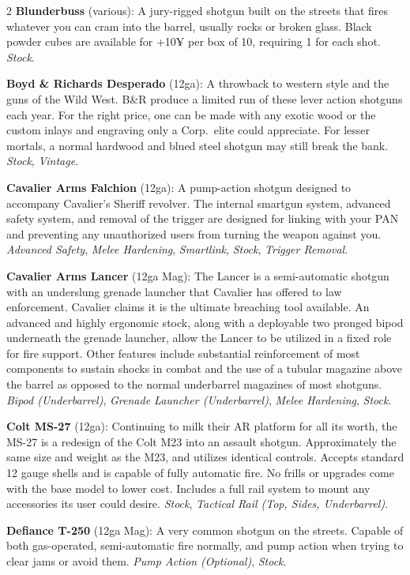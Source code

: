 \documentclass[
  oneside]{article}
\begin{document}
\begin{multicols}{2}
\textbf{Blunderbuss} (various): A jury-rigged
shotgun built on the streets that fires whatever
you can cram into the barrel, usually rocks or
broken glass. Black powder cubes are available for
+10¥ per box of 10, requiring 1 for each shot.
\emph{Stock}.

\textbf{Boyd \& Richards Desperado} (12ga): A
throwback to western style and the guns of the
Wild West. B\&R produce a limited run of these
lever action shotguns each year. For the right
price, one can be made with any exotic wood or the
custom inlays and engraving only a Corp.~elite
could appreciate. For lesser mortals, a normal
hardwood and blued steel shotgun may still break
the bank. \emph{Stock}, \emph{Vintage}.

\textbf{Cavalier Arms Falchion} (12ga): A
pump-action shotgun designed to accompany
Cavalier's Sheriff revolver. The internal smartgun
system, advanced safety system, and removal of the
trigger are designed for linking with your PAN and
preventing any unauthorized users from turning the
weapon against you. \emph{Advanced Safety},
\emph{Melee Hardening}, \emph{Smartlink},
\emph{Stock}, \emph{Trigger Removal}.

\textbf{Cavalier Arms Lancer} (12ga Mag): The
Lancer is a semi-automatic shotgun with an
underslung grenade launcher that Cavalier has
offered to law enforcement. Cavalier claims it is
the ultimate breaching tool available. An advanced
and highly ergonomic stock, along with a
deployable two pronged bipod underneath the
grenade launcher, allow the Lancer to be utilized
in a fixed role for fire support. Other features
include substantial reinforcement of most
components to sustain shocks in combat and the use
of a tubular magazine above the barrel as opposed
to the normal underbarrel magazines of most
shotguns. \emph{Bipod (Underbarrel)},
\emph{Grenade Launcher (Underbarrel)}, \emph{Melee
Hardening}, \emph{Stock}.

\textbf{Colt MS-27} (12ga): Continuing to milk
their AR platform for all its worth, the MS-27 is
a redesign of the Colt M23 into an assault
shotgun. Approximately the same size and weight as
the M23, and utilizes identical controls. Accepts
standard 12 gauge shells and is capable of fully
automatic fire. No frills or upgrades come with
the base model to lower cost. Includes a full rail
system to mount any accessories its user could
desire. \emph{Stock}, \emph{Tactical Rail (Top,
Sides, Underbarrel)}.

\textbf{Defiance T-250} (12ga Mag): A very common
shotgun on the streets. Capable of both
gas-operated, semi-automatic fire normally, and
pump action when trying to clear jams or avoid
them. \emph{Pump Action (Optional)}, \emph{Stock}.


\end{multicols}
\end{document}
